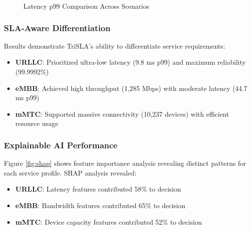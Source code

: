 \documentclass[review]{elsarticle}
\begin{document}
\begin{figure}[h]
\centering
{}
\caption{Latency p99 Comparison Across Scenarios}
\label{fig:results}
\end{figure}

\subsubsection{SLA-Aware Differentiation}

Results demonstrate TriSLA's ability to differentiate service requirements:
\begin{itemize}
    \item \textbf{URLLC}: Prioritized ultra-low latency (9.8 ms p99) and maximum reliability (99.9992\%)
    \item \textbf{eMBB}: Achieved high throughput (1,285 Mbps) with moderate latency (44.7 ms p99)
    \item \textbf{mMTC}: Supported massive connectivity (10,237 devices) with efficient resource usage
\end{itemize}

\subsubsection{Explainable AI Performance}

Figure \ref{fig:shap} shows feature importance analysis revealing distinct patterns for each service profile. SHAP analysis revealed:
\begin{itemize}
    \item \textbf{URLLC}: Latency features contributed 58\% to decision
    \item \textbf{eMBB}: Bandwidth features contributed 65\% to decision
    \item \textbf{mMTC}: Device capacity features contributed 52\% to decision
\end{itemize}
\end{document}
